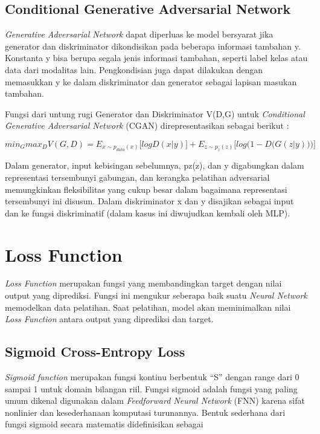 \subsection{Conditional Generative Adversarial Network}
\label{subsec:conditionalGAN}

\emph{Generative Adversarial Network} dapat diperluas ke model bersyarat jika generator dan diskriminator dikondisikan pada beberapa informasi tambahan y. 
Konstanta y bisa berupa segala jenis informasi tambahan, seperti label kelas atau data dari modalitas lain. 
Pengkondisian juga dapat dilakukan dengan memasukkan y ke dalam diskriminator dan generator sebagai lapisan masukan tambahan.

Fungsi dari untung rugi Generator dan Diskriminator V(D,G) untuk \emph{Conditional Generative Adversarial Network} (CGAN) direpresentasikan sebagai berikut :

\begin{equation}
  \label{eq:CGAN}
  min_{G} max_{D} V(G,D) =  E_{x \sim p_{data} (x)} \big[ log D(x|y) \big] + E_{z \sim p_{z} (z)} \big[ log  \big(1-D \big(G(z|y)\big) \big) \big]
\end{equation}

Dalam generator, input kebisingan sebelumnya, pz(z), dan y digabungkan dalam representasi tersembunyi gabungan, dan kerangka pelatihan adversarial memungkinkan fleksibilitas yang cukup besar dalam bagaimana representasi tersembunyi ini disusun. 
Dalam diskriminator x dan y disajikan sebagai input dan ke fungsi diskriminatif (dalam kasus ini diwujudkan kembali oleh MLP). \parencite{CGAN}

\section{Loss Function}
\label{sec:lossFunction}

\emph{Loss Function} merupakan fungsi yang membandingkan target dengan nilai output yang diprediksi. 
Fungsi ini mengukur seberapa baik suatu \emph{Neural Network} memodelkan data pelatihan. 
Saat pelatihan, model akan meminimalkan nilai \emph{Loss Function} antara output yang diprediksi dan target.

\subsection{Sigmoid Cross-Entropy Loss}
\label{sigmoidCrossEntropyLoss}

\emph{Sigmoid function} merupakan fungsi kontinu berbentuk “S” dengan range dari 0 sampai 1 untuk domain bilangan riil. 
Fungsi sigmoid adalah fungsi yang paling umum dikenal digunakan dalam \emph{Feedforward Neural Network} (FNN) karena sifat nonlinier dan kesederhanaan komputasi turunannya. 
Bentuk sederhana dari fungsi sigmoid secara matematis didefinisikan sebagai 

